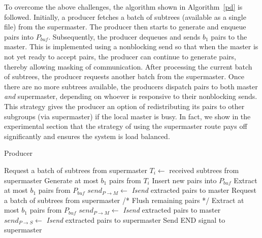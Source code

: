 \documentclass[10pt,journal,letterpaper,compsoc]{IEEEtran}
\begin{document}
To overcome the above challenges, the algorithm shown in Algorithm~\ref{pd} is followed. Initially, a producer fetches a batch of subtrees (available as a single file) from the supermaster. The producer then starts to generate and enqueue pairs into $P_{buf}$. Subsequently, the producer dequeues and sends $b_1$ pairs to the master. This is implemented using a nonblocking send so that when the master is not yet ready to accept pairs, the producer can continue to generate pairs, thereby allowing masking of communication. After processing the current batch of subtrees, the producer requests another batch from the supermaster. Once there are no more subtrees available, the producers dispatch pairs to both master \emph{and} supermaster, depending on whoever is responsive to their nonblocking sends. This strategy gives the producer an option of redistributing its pairs to other subgroups (via supermaster) if the local master is busy. In fact, we show in the experimental section that the strategy of using the supermaster route pays off significantly and ensures the system is load balanced. \\

\begin{algorithm}
\caption{Producer}
\label{pd}
\begin{algorithmic}[1]
    \STATE Request a batch of subtrees from supermaster
    \WHILE{\TRUE}
        \STATE $T_i \leftarrow$ received subtrees from supermaster 
        \ENDIF
        \REPEAT
                \STATE Generate at most $b_1$ pairs from $T_i$
                \STATE Insert new pairs into $P_{buf}$
            \ENDIF
                \STATE Extract at most $b_1$ pairs from $P_{buf}$
                \STATE $send_{P\rightarrow M}\leftarrow$ {\it Isend} extracted pairs to master
            \ENDIF
        \STATE Request a batch of subtrees from supermaster
    \ENDWHILE
    \STATE /* Flush remaining pairs */
        \STATE Extract at most $b_1$ pairs from $P_{buf}$
            \STATE $send_{P\rightarrow M}\leftarrow$ {\it Isend} extracted pairs to master
        \ENDIF
            \STATE $send_{P\rightarrow S}\leftarrow$ {\it Isend} extracted pairs to supermaster
        \ENDIF
    \ENDWHILE
    \STATE Send END signal to supermaster
\end{algorithmic}
\end{algorithm}
\end{document}
